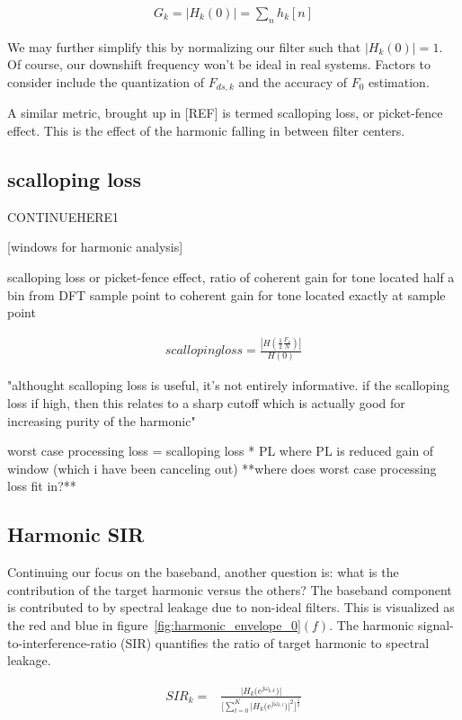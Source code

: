 \documentclass [11pt, proquest] {uwthesis}[2015/03/03]
\begin{document}
\begin{align}
G_k = \Big| H_k(0) \Big| = \sum_n h_k[n]
\end{align}

We may further simplify this by normalizing our filter such that $\Big| H_k(0) \Big| = 1$.  Of course, our downshift frequency won't be ideal in real systems.  Factors to consider include the quantization of $F_{ds,k}$ and the accuracy of $F_0$ estimation.

A similar metric, brought up in [REF] is termed scalloping loss, or picket-fence effect.  This is the effect of the harmonic falling in between filter centers.

\subsection{scalloping loss}

CONTINUEHERE1

[windows for harmonic analysis]

scalloping loss or picket-fence effect, ratio of coherent gain for tone located half a bin from DFT sample point to coherent gain for tone located exactly at sample point

\begin{align}
scalloping loss = \frac{| H(\frac{1}{2} \frac{F_s}{N}) |}{H(0)}
\end{align}

"althought scalloping loss is useful, it's not entirely informative.  if the scalloping loss if high, then this relates to a sharp cutoff which is actually good for increasing purity of the harmonic"

worst case processing loss = scalloping loss * PL
where PL is reduced gain of window (which i have been canceling out)
**where does worst case processing loss fit in?**

\subsection{Harmonic SIR}

Continuing our focus on the baseband, another question is: what is the contribution of the target harmonic versus the others?  The baseband component is contributed to by spectral leakage due to non-ideal filters.  This is visualized as the red and blue in figure~\ref{fig:harmonic_envelope_0}$(f)$.  The harmonic signal-to-interference-ratio (SIR) quantifies the ratio of target harmonic to spectral leakage.

\begin{align}
SIR_k =& \frac{\Big| H_k\big(e^{j\omega_{k,k}}\big) \Big|} {\Bigg[ \sum\limits_{l=0}^K \Big|H_k\big(e^{j\omega_{k,l}}\big)\Big|^2 \Bigg] ^ \frac{1}{2}}
\end{align}
\end{document}
